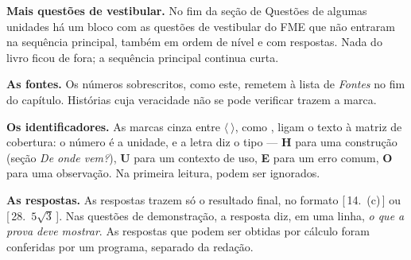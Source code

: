 \textbf{Mais questões de vestibular.} No fim da seção de Questões de algumas unidades há um bloco com as questões de vestibular do FME que não entraram na sequência principal, também em ordem de nível e com respostas. Nada do livro ficou de fora; a sequência principal continua curta.

\textbf{As fontes.} Os números sobrescritos, como este, remetem à lista de \emph{Fontes} no fim do capítulo. Histórias cuja veracidade não se pode verificar trazem a marca\anedota.

\textbf{Os identificadores.} As marcas cinza entre $\langle\ \rangle$, como , ligam o texto à matriz de cobertura: o número é a unidade, e a letra diz o tipo — \textbf{H} para uma construção (seção \emph{De onde vem?}), \textbf{U} para um contexto de uso, \textbf{E} para um erro comum, \textbf{O} para uma observação. Na primeira leitura, podem ser ignorados.

\textbf{As respostas.} As respostas trazem só o resultado final, no formato [\,14.\ (c)\,] ou [\,28.\ $5\sqrt3$\,]. Nas questões de demonstração, a resposta diz, em uma linha, \emph{o que a prova deve mostrar}. As respostas que podem ser obtidas por cálculo foram conferidas por um programa, separado da redação.
\clearpage
